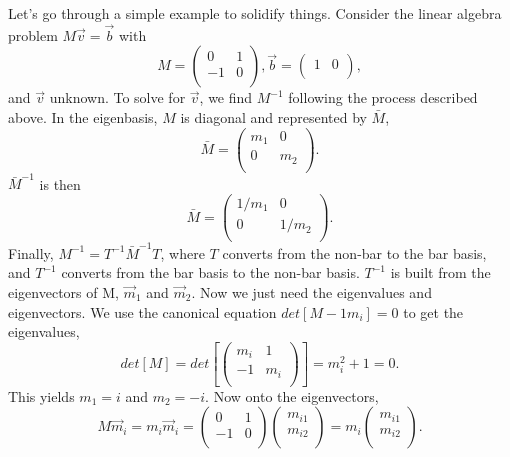 \documentclass[12pt]{article}
\begin{document}
Let's go through a simple example to solidify things. Consider the linear algebra problem $M\vec{v} = \vec{b}$ with 
\begin{equation} 
M = 
\begin{pmatrix}
0 & 1 \\
-1 & 0 \\
\end{pmatrix},
\vec{b} = 
\begin{pmatrix}
1 & 0 \\
\end{pmatrix},
\end{equation}
and $\vec{v}$ unknown. To solve for $\vec{v}$, we find $M^{-1}$ following the process described above. In the eigenbasis, $M$ is diagonal and represented by $\bar{M}$,
\begin{equation}
\bar{M} = 
\begin{pmatrix}
m_1 & 0 \\
0 & m_2 \\ 
\end{pmatrix}.
\end{equation}
$\bar{M}^{-1}$ is then 
\begin{equation}
\bar{M} = 
\begin{pmatrix}
1/m_1 & 0 \\
0 & 1/m_2 \\ 
\end{pmatrix}.
\end{equation}
Finally, $M^{-1} = T^{-1}\bar{M}^{-1}T$, where $T$ converts from the non-bar to the bar basis, and $T^{-1}$ converts from the bar basis to the non-bar basis. $T^{-1}$ is built from the eigenvectors of M, $\vec{m}_1$ and $\vec{m}_2$. Now we just need the eigenvalues and eigenvectors. We use the canonical equation $det[M - 1m_i] = 0$ to get the eigenvalues, 
\begin{equation}
det[M] = det\left[
\begin{pmatrix}
m_i & 1 \\
-1 & m_i \\ 
\end{pmatrix}\right] = m_i^2 + 1 = 0.
\end{equation}
This yields $m_1 = i$ and $m_2 = -i$. Now onto the eigenvectors,
\begin{equation}
M\vec{m}_i = m_i\vec{m}_i =
\begin{pmatrix}
0 & 1 \\
-1 & 0 \\ 
\end{pmatrix} 
\begin{pmatrix}
m_{i1} \\ m_{i2} \\
\end{pmatrix}
=
m_i
\begin{pmatrix}
m_{i1} \\ m_{i2} \\
\end{pmatrix}. 
\end{equation}
\end{document}
